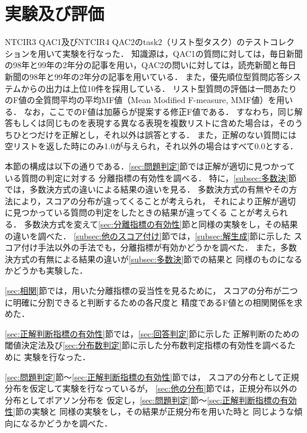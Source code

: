 \documentclass[japanese]{jnlp_1.4}
\begin{document}
\section{実験及び評価}\label{Chapter:exp-eval}

NTCIR3 QAC1\cite{Fukumoto:QAC1}及びNTCIR4 QAC2のtask2（リスト型タスク）\cite{Fukumoto:QAC2Subtask12}のテストコレクションを用いて実験を行なった．
知識源は，QAC1の質問に対しては，毎日新聞の98年と99年の2年分の記事を用い，QAC2の問いに対しては，読売新聞と毎日新聞の98年と99年の2年分の記事を用いている．
また，優先順位型質問応答システムからの出力は上位10件を採用している．
リスト型質問の評価は一問あたりのF値の全質問平均の平均MF値（Mean Modified F-measure, MMF値）を用いる．
なお，ここでのF値は加藤らが提案する修正F値である\cite{加藤:リスト型質問応答の特徴付けと評価指標}．
すなわち，同じ解答もしくは同じものを表現する異なる表現を複数リストに含めた場合は，そのうちひとつだけを正解とし，それ以外は誤答とする．
また，正解のない質問には空リストを返した時にのみ1.0が与えられ，それ以外の場合はすべて0.0とする．

本節の構成は以下の通りである．\ref{sec:問題判定}節では正解が適切に見つかっている質問の判定に対する
分離指標の有効性を調べる．
特に，\ref{subsec:多数決}節では，多数決方式の違いによる結果の違いを見る．
多数決方式の有無やその方法により，スコアの分布が違ってくることが考えられ，
それにより正解が適切に見つかっている質問の判定をしたときの結果が違ってくる
ことが考えられる．
多数決方式を変えて\ref{sec:分離指標の有効性}節と同様の実験をし，その結果の違いを調べた．
\ref{subsec:他のスコア付け}節では，\ref{subsec:解生成}節に示した
スコア付け手法以外の手法でも，分離指標が有効かどうかを調べた．
また，多数決方式の有無による結果の違いが\ref{subsec:多数決}節での結果と
同様のものになるかどうかも実験した．

\ref{sec:相関}節では，用いた分離指標の妥当性を見るために，
スコアの分布が二つに明確に分割できると判断するための各尺度と
精度であるF値との相関関係を求めた．

\ref{sec:正解判断指標の有効性}節では，\ref{sec:回答判定}節に示した
正解判断のための閾値決定法及び\ref{sec:分布数判定}節に示した分布数判定指標の有効性を調べるために
実験を行なった．

\ref{sec:問題判定}節〜\ref{sec:正解判断指標の有効性}節では，
スコアの分布として正規分布を仮定して実験を行なっているが，
\ref{sec:他の分布}節では，正規分布以外の分布としてポアソン分布を
仮定し，\ref{sec:問題判定}節〜\ref{sec:正解判断指標の有効性}節の実験と
同様の実験をし，その結果が正規分布を用いた時と
同じような傾向になるかどうかを調べた．
\end{document}
